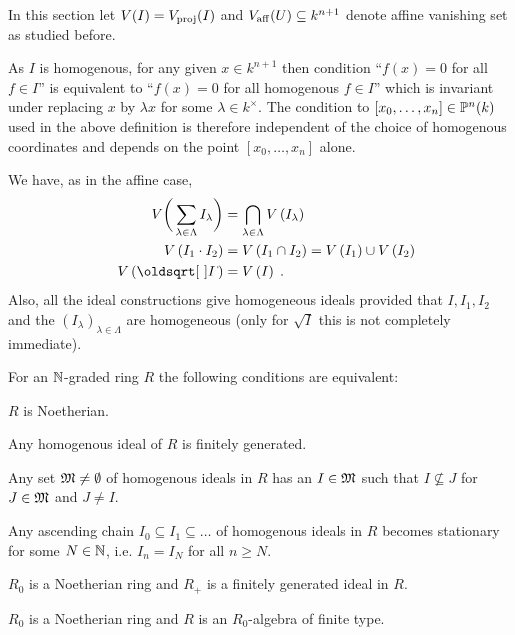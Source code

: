 \documentclass[a4paper,parskip=half,numbers=enddot, DIV=12]{scrreprt}
\begin{document}
\begin{rem}
    \begin{alphanumerate}
        \item 
            In this section let $V(I) = V_{\mathrm{proj}}(I)$ and $V_{\mathrm{aff}}(U) \subseteq k^{n+1}$ denote affine vanishing set as studied before.
        \item 
            As $I$ is homogenous, for any given $x\in k^{n+1}$ then condition ``$f(x)= 0$ for all $f\in I$''  is equivalent to ``$f(x) = 0$ for all homogenous $f\in I$'' which is invariant under replacing $x$ by $\lambda x$ for some $\lambda \in k^\times$. The condition to $[x_0,\ldots,x_n]\in \mathbb{P}^n(k)$ used in the above definition is therefore independent of the choice of homogenous coordinates and depends on the point $[x_0,\ldots, x_n]$ alone.
        \item 
            We have, as in the affine case,
            \begin{align}\lbl{eq:projectiveVanishingOp}
                \begin{split}
                V\bigg(\sum_{\lambda\in \Lambda}I_\lambda\bigg) &= \bigcap_{\lambda\in \Lambda} V\left(I_\lambda\right)\\
                \quad V\left(I_1\cdot I_2\right) &= V\left(I_1\cap I_2\right) = V\left(I_1\right)\cup V\left(I_2\right)\\
                \quad V\left(\sqrt{I}\right)&= V\left(I\right)\;.
                \end{split}
            \end{align}
            Also, all the ideal constructions give homogeneous ideals provided that $I,I_1,I_2$ and the $(I_\lambda)_{\lambda\in\Lambda}$ are homogeneous (only for $\sqrt{I}$ this is not completely immediate).
    \end{alphanumerate}
\end{rem}

\begin{prop}
    For an $\mathbb{N}$-graded ring $R$ the following conditions are equivalent:
    \begin{alphanumerate}
        \item 
            $R$ is Noetherian.
        \item 
            Any homogenous ideal of $R$ is finitely generated.
        \item
            Any set $\mathfrak{M}\neq \emptyset$ of homogenous ideals in $R$ has an $I\in \mathfrak{M}$ such that $I\not\subseteq J$ for $J\in \mathfrak{M}$ and $J\neq I$.
        \item 
            Any ascending chain $I_0\subseteq I_1\subseteq \ldots$ of homogenous ideals in $R$ becomes stationary for some $N\in\mathbb{N}$, i.e. $I_n = I_N$ for all $n\geq N$.
        \item 
            $R_0$ is a Noetherian ring and $R_+$ is a finitely generated ideal in $R$.
        \item 
            $R_0$ is a Noetherian ring and $R$ is an $R_0$-algebra of finite type.
    \end{alphanumerate}
\end{prop}
\end{document}
